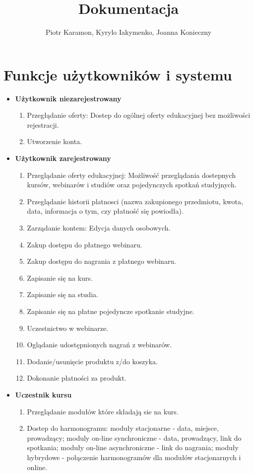 \documentclass[11pt]{article}
\author{Piotr Karamon, Kyrylo Iakymenko, Joanna Konieczny}
\date{}
\title{Dokumentacja}
\begin{document}
\maketitle
\tableofcontents

\section{Funkcje użytkowników i systemu}
\label{sec:org85d6be8}
\begin{itemize}
\item \textbf{Użytkownik niezarejestrowany}
\begin{enumerate}
\item Przegłądanie oferty: Dostep do ogólnej oferty edukacyjnej bez możliwości rejestracji.
\item Utworzenie konta.
\end{enumerate}
\item \textbf{Użytkownik zarejestrowany}
\begin{enumerate}
\item Przeglądanie oferty edukacyjnej: Możliwość przeglądania dostepnych kursów, webinarów i studiów oraz pojedynczych spotkań studyjnych.
\item Przeglądanie historii platnosci (nazwa zakupionego przedmiotu, kwota, data, informacja o tym, czy płatność się powiodła).
\item Zarządanie kontem: Edycja danych osobowych.
\item Zakup dostępu do płatnego webinaru.
\item Zakup dostępu do nagrania z płatnego webinaru.
\item Zapisanie się na kurs.
\item Zapisanie się na studia.
\item Zapisanie się na płatne pojedyncze spotkanie studyjne.
\item Uczestnictwo w webinarze.
\item Oglądanie udostępnionych nagrań z webinarów.
\item Dodanie/usunięcie produktu z/do koszyka.
\item Dokonanie płatności za produkt.
\end{enumerate}
\item \textbf{Uczestnik kursu}
\begin{enumerate}
\item Przeglądanie modułów które składają sie na kurs.
\item Dostep do harmonogramu: moduły stacjonarne - data, miejsce, prowadzący; moduly on-line synchroniczne - data, prowadzący, link do spotkania; moduły on-line asynchroniczne - link do nagrania; moduły hybrydowe - połączenie harmonogramów dla modułów stacjonarnych i online.

\end{enumerate}
\end{itemize}
\end{document}
